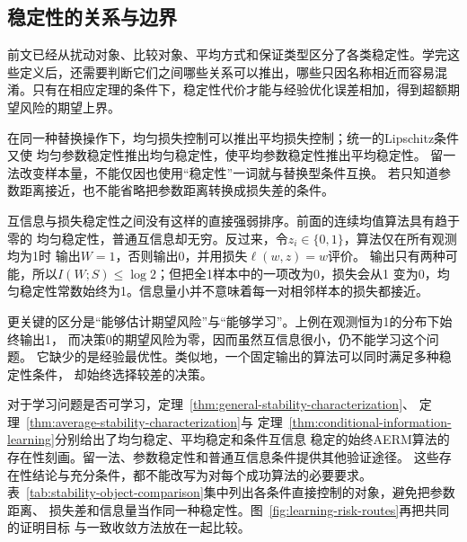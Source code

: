 \subsection{稳定性的关系与边界}
\label{sec:stability-comparison}

前文已经从扰动对象、比较对象、平均方式和保证类型区分了各类稳定性。学完这些定义后，还需要判断它们之间哪些关系可以推出，哪些只因名称相近而容易混淆。只有在相应定理的条件下，稳定性代价才能与经验优化误差相加，得到超额期望风险的期望上界。

在同一种替换操作下，均匀损失控制可以推出平均损失控制；统一的Lipschitz条件又使
均匀参数稳定性推出均匀稳定性，使平均参数稳定性推出平均稳定性。
留一法改变样本量，不能仅因也使用“稳定性”一词就与替换型条件互换。
若只知道参数距离接近，也不能省略把参数距离转换成损失差的条件。

互信息与损失稳定性之间没有这样的直接强弱排序。前面的连续均值算法具有趋于零的
均匀稳定性，普通互信息却无穷。反过来，令$z_i\in\{0,1\}$，算法仅在所有观测均为1时
输出$W=1$，否则输出0，并用损失$\ell(w,z)=w$评价。
输出只有两种可能，所以$I(W;S)\leq\log2$；但把全1样本中的一项改为0，损失会从1
变为0，均匀稳定性常数始终为1。信息量小并不意味着每一对相邻样本的损失都接近。

更关键的区分是“能够估计期望风险”与“能够学习”。上例在观测恒为1的分布下始终输出1，
而决策0的期望风险为零，因而虽然互信息很小，仍不能学习这个问题。
它缺少的是经验最优性。类似地，一个固定输出的算法可以同时满足多种稳定性条件，
却始终选择较差的决策。

对于学习问题是否可学习，定理~\ref{thm:general-stability-characterization}、
定理~\ref{thm:average-stability-characterization}与
定理~\ref{thm:conditional-information-learning}分别给出了均匀稳定、平均稳定和条件互信息
稳定的始终AERM算法的存在性刻画。留一法、参数稳定性和普通互信息条件提供其他验证途径。
这些存在性结论与充分条件，都不能改写为对每个成功算法的必要要求。
表~\ref{tab:stability-object-comparison}集中列出各条件直接控制的对象，避免把参数距离、
损失差和信息量当作同一种稳定性。图~\ref{fig:learning-risk-routes}再把共同的证明目标
与一致收敛方法放在一起比较。

